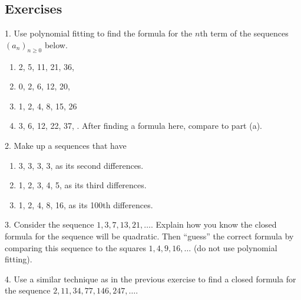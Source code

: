 \documentclass[12pt,]{book}
\theoremstyle{plain}
\theoremstyle{definition}
\theoremstyle{definition}
\theoremstyle{definition}
\numberwithin{equation}{chapter}
\begin{document}
\subsection*{Exercises}\label{exercises_seq-polyfit}
\begin{exerciselist}
\item[1.]\hypertarget{exercise-23}{}\hypertarget{p-252}{}%
Use polynomial fitting to find the formula for the \(n\)th term of the sequences \((a_n)_{n \ge 0}\) below.%
\par
\hypertarget{p-253}{}%
\leavevmode%
\begin{enumerate}[label=(\alph*)]
\item\hypertarget{li-161}{}\hypertarget{p-254}{}%
2, 5, 11, 21, 36,\textellipsis{}%
\item\hypertarget{li-162}{}\hypertarget{p-255}{}%
0, 2, 6, 12, 20,\textellipsis{}%
\item\hypertarget{li-163}{}\hypertarget{p-256}{}%
1, 2, 4, 8, 15, 26 \textellipsis{}%
\item\hypertarget{li-164}{}\hypertarget{p-257}{}%
3, 6, 12, 22, 37, \textellipsis{}.  After finding a formula here, compare to part (a).%
\end{enumerate}
%
\par\smallskip
\item[2.]\hypertarget{exercise-24}{}\hypertarget{p-260}{}%
Make up a sequences that have \leavevmode%
\begin{enumerate}[label=(\alph*)]
\item\hypertarget{li-167}{}3, 3, 3, 3, \textellipsis{} as its second differences.%
\item\hypertarget{li-168}{}1, 2, 3, 4, 5, \textellipsis{} as its third differences.%
\item\hypertarget{li-169}{}1, 2, 4, 8, 16, \textellipsis{} as its 100th differences.%
\end{enumerate}
%
\par\smallskip
\item[3.]\hypertarget{exercise-25}{}\hypertarget{p-261}{}%
Consider the sequence \(1, 3, 7, 13, 21, \ldots\). Explain how you know the closed formula for the sequence will be quadratic. Then ``guess'' the correct formula by comparing this sequence to the squares \(1, 4, 9, 16, \ldots\) (do not use polynomial fitting).%
\par\smallskip
\item[4.]\hypertarget{exercise-26}{}\hypertarget{p-264}{}%
Use a similar technique as in the previous exercise to find a closed formula for the sequence \(2, 11, 34, 77, 146, 247,\ldots\).%

\end{exerciselist}
\end{document}
